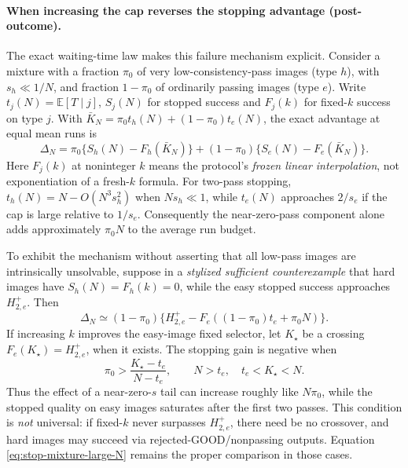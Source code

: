 

\paragraph{When increasing the cap reverses the stopping advantage (post-outcome).}
The exact waiting-time law makes this failure mechanism explicit.
Consider a mixture with a fraction $\pi_0$ of very
low-consistency-pass images (type $h$), with $s_h\ll 1/N$,
and fraction $1-\pi_0$ of ordinarily passing images (type $e$).
Write $t_j(N)=\mathbb E[T\mid j]$, $S_j(N)$ for stopped
success and $F_j(k)$ for fixed-$k$ success on type $j$.
With $\bar K_N=\pi_0t_h(N)+(1-\pi_0)t_e(N)$,
the exact advantage at equal mean runs is
\begin{equation}\label{eq:stop-mixture-large-N}
 \Delta_N =
 \pi_0\{S_h(N)-F_h(\bar K_N)\}
 +(1-\pi_0)\{S_e(N)-F_e(\bar K_N)\}.
\end{equation}
Here $F_j(k)$ at noninteger $k$ means the protocol's
\emph{frozen linear interpolation}, not exponentiation
of a fresh-$k$ formula.
For two-pass stopping, $t_h(N)=N-O(N^3s_h^2)$
when $Ns_h\ll1$, while $t_e(N)$ approaches
$2/s_e$ if the cap is large relative to $1/s_e$.
Consequently the near-zero-pass component alone adds
approximately $\pi_0N$ to the average run budget.

To exhibit the mechanism without asserting that all low-pass
images are intrinsically unsolvable, suppose in a
\emph{stylized sufficient counterexample} that hard images
have $S_h(N)=F_h(k)=0$, while the easy stopped
success approaches $H^+_{2,e}$.
Then
\[
 \Delta_N\simeq (1-\pi_0)
 \{H^+_{2,e}-F_e((1-\pi_0)t_e+\pi_0N)\}.
\]
If increasing $k$ improves the easy-image fixed selector,
let $K_\star$ be a crossing
$F_e(K_\star)=H^+_{2,e}$, when it exists.
The stopping gain is negative when
\begin{equation}\label{eq:stop-pi0-crossing}
  \pi_0>\frac{K_\star-t_e}{N-t_e},
  \qquad N>t_e,\quad t_e<K_\star<N.
\end{equation}
Thus the effect of a near-zero-$s$ tail can increase
roughly like $N\pi_0$, while the
stopped quality on easy images saturates after the first
two passes. This condition is \emph{not} universal:
if fixed-$k$ never surpasses $H^+_{2,e}$, there
need be no crossover, and hard images may succeed via
rejected-GOOD/nonpassing outputs. Equation
\eqref{eq:stop-mixture-large-N} remains the proper
comparison in those cases.

